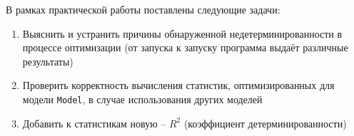 В рамках практической работы поставлены следующие задачи:

\begin{enumerate}
	\item Выяснить и устранить причины обнаруженной недетерминированности в процессе оптимизации (от запуска к запуску программа выдаёт различные результаты)
	\item Проверить корректность вычисления статистик, оптимизированных для модели \texttt{Model}, в случае использования других моделей
	\item Добавить к статистикам новую -- $ R^2 $ (коэффициент детерминированности)
\end{enumerate}
